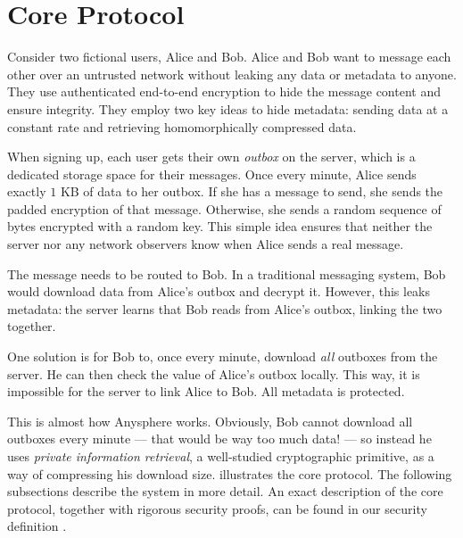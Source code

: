 \section{Core Protocol}
\label{sec:coreprotocol}


Consider two fictional users, Alice and Bob. Alice and Bob want to message each other over an untrusted network without leaking any data or metadata to anyone. They use authenticated end-to-end encryption to hide the message content and ensure integrity. They employ two key ideas to hide metadata: sending data at a constant rate and retrieving homomorphically compressed data.


When signing up, each user gets their own \textit{outbox} on the server, which is a dedicated storage space for their messages. Once every minute, Alice sends exactly $1$ KB of data to her outbox. If she has a message to send, she sends the padded encryption of that message. Otherwise, she sends a random sequence of bytes encrypted with a random key. This simple idea ensures that neither the server nor any network observers know when Alice sends a real message.


The message needs to be routed to Bob. In a traditional messaging system, Bob would download data from Alice's outbox and decrypt it. However, this leaks metadata:$~$the server learns that Bob reads from Alice's outbox, linking the two together.

One solution is for Bob to, once every minute, download \textit{all} outboxes from the server. He can then check the value of Alice's outbox locally. This way, it is impossible for the server to link Alice to Bob. All metadata is protected.

This is almost how Anysphere works. Obviously, Bob cannot download all outboxes every minute — that would be way too much data! — so instead he uses \textit{private information retrieval}, a well-studied cryptographic primitive, as a way of compressing his download size.  illustrates the core protocol. The following subsections describe the system in more detail. An exact description of the core protocol, together with rigorous security proofs, can be found in our security definition \cite{LAZ22SecDef}.

